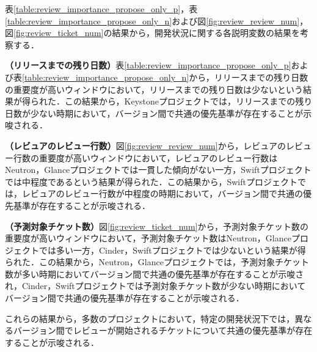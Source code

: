 \documentclass[submit]{ipsj}
\begin{document}
表\ref{table:review_importance_propose_only_p}，表\ref{table:review_importance_propose_only_n}および図\ref{fig:review_review_num}，図\ref{fig:review_ticket_num}の結果から，開発状況に関する各説明変数の結果を考察する．

\textbf{（リリースまでの残り日数）}表\ref{table:review_importance_propose_only_p}および表\ref{table:review_importance_propose_only_n}から，リリースまでの残り日数の重要度が高いウィンドウにおいて，リリースまでの残り日数は少ないという結果が得られた．この結果から，Keystoneプロジェクトでは，リリースまでの残り日数が少ない時期において，バージョン間で共通の優先基準が存在することが示唆される．

\textbf{（レビュアのレビュー行数）}図\ref{fig:review_review_num}から，レビュアのレビュー行数の重要度が高いウィンドウにおいて，レビュアのレビュー行数はNeutron，Glanceプロジェクトでは一貫した傾向がない一方，Swiftプロジェクトでは中程度であるという結果が得られた．この結果から，Swiftプロジェクトでは，レビュアのレビュー行数が中程度の時期において，バージョン間で共通の優先基準が存在することが示唆される．

\textbf{（予測対象チケット数）}図\ref{fig:review_ticket_num}から，予測対象チケット数の重要度が高いウィンドウにおいて，予測対象チケット数はNeutron，Glanceプロジェクトでは多い一方，Cinder，Swiftプロジェクトでは少ないという結果が得られた．この結果から，Neutron，Glanceプロジェクトでは，予測対象チケット数が多い時期においてバージョン間で共通の優先基準が存在することが示唆され，Cinder，Swiftプロジェクトでは予測対象チケット数が少ない時期においてバージョン間で共通の優先基準が存在することが示唆される．

これらの結果から，多数のプロジェクトにおいて，特定の開発状況下では，異なるバージョン間でレビューが開始されるチケットについて共通の優先基準が存在することが示唆される．
\end{document}
